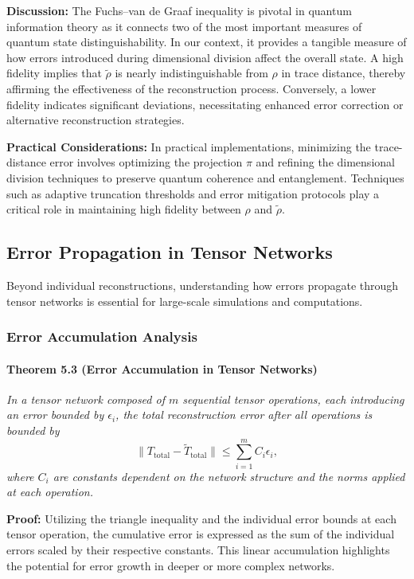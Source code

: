 \documentclass[sn-mathphys-num]{sn-jnl}
\theoremstyle{thmstyleone}
\theoremstyle{thmstyletwo}
\theoremstyle{thmstylethree}
\begin{document}
\textbf{Discussion:} The Fuchs--van de Graaf inequality is pivotal in quantum information theory as it connects two of the most important measures of quantum state distinguishability. In our context, it provides a tangible measure of how errors introduced during dimensional division affect the overall state. A high fidelity implies that $\tilde{\rho}$ is nearly indistinguishable from $\rho$ in trace distance, thereby affirming the effectiveness of the reconstruction process. Conversely, a lower fidelity indicates significant deviations, necessitating enhanced error correction or alternative reconstruction strategies.

\textbf{Practical Considerations:} In practical implementations, minimizing the trace-distance error involves optimizing the projection $\pi$ and refining the dimensional division techniques to preserve quantum coherence and entanglement. Techniques such as adaptive truncation thresholds and error mitigation protocols play a critical role in maintaining high fidelity between $\rho$ and $\tilde{\rho}$.

\subsection{Error Propagation in Tensor Networks}

Beyond individual reconstructions, understanding how errors propagate through tensor networks is essential for large-scale simulations and computations.

\subsubsection{Error Accumulation Analysis}
\paragraph{Theorem 5.3 (Error Accumulation in Tensor Networks)}
\emph{In a tensor network composed of $m$ sequential tensor operations, each introducing an error bounded by $\epsilon_i$, the total reconstruction error after all operations is bounded by}
\[
\|T_{\text{total}} - \tilde{T}_{\text{total}}\| \leq \sum_{i=1}^m C_i \epsilon_i,
\]
\emph{where $C_i$ are constants dependent on the network structure and the norms applied at each operation.}

\textbf{Proof:} Utilizing the triangle inequality and the individual error bounds at each tensor operation, the cumulative error is expressed as the sum of the individual errors scaled by their respective constants. This linear accumulation highlights the potential for error growth in deeper or more complex networks.
\end{document}
